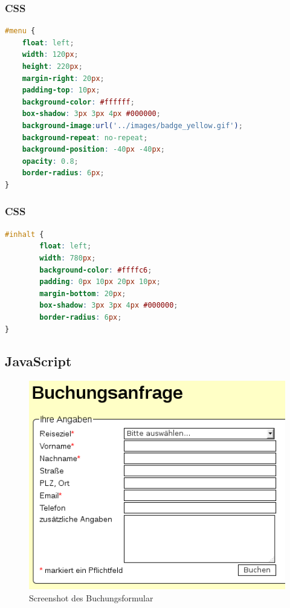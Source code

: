 \documentclass[xcolor=dvipsnames]{beamer}
\begin{document}
\begin{frame}[fragile]
\frametitle{CSS}

\begin{lstlisting}[language=CSS, firstnumber=12]
#menu {
    float: left;
    width: 120px;
    height: 220px;
    margin-right: 20px;
    padding-top: 10px;
    background-color: #ffffff;
    box-shadow: 3px 3px 4px #000000;
    background-image:url('../images/badge_yellow.gif');
    background-repeat: no-repeat;
    background-position: -40px -40px;
    opacity: 0.8;
    border-radius: 6px;
}
\end{lstlisting}
\end{frame}

\begin{frame}[fragile]
\frametitle{CSS}

\begin{lstlisting}[language=CSS, firstnumber=51]
#inhalt {
        float: left;
        width: 780px;
        background-color: #ffffc6;
        padding: 0px 10px 20px 10px;
        margin-bottom: 20px;
        box-shadow: 3px 3px 4px #000000;
        border-radius: 6px;
}

\end{lstlisting}
\end{frame}


\subsection{JavaScript}
\begin{frame} %
	\begin{figure}
	\includegraphics[scale=0.5]{screenshot_buchung.png}
	\caption{Screenshot des Buchungsformular}
	\end{figure}
\end{frame}
\end{document}
